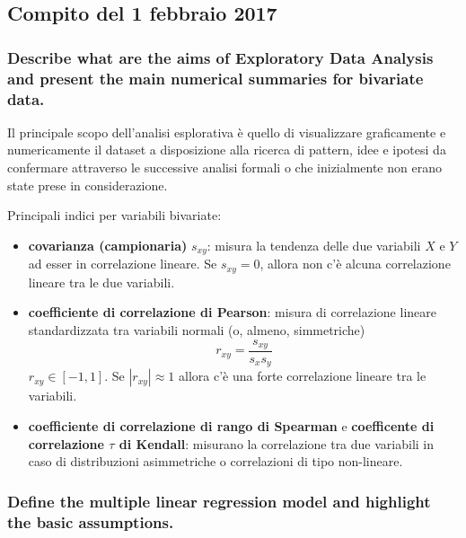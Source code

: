 \documentclass[
]{article}
\author{}
\date{\vspace{-2.5em}}
\begin{document}
\hypertarget{compito-del-1-febbraio-2017}{%
\subsection{Compito del 1 febbraio
2017}\label{compito-del-1-febbraio-2017}}

\hypertarget{describe-what-are-the-aims-of-exploratory-data-analysis-and-present-the-main-numerical-summaries-for-bivariate-data.}{%
\subsubsection{Describe what are the aims of Exploratory Data Analysis
and present the main numerical summaries for bivariate
data.}\label{describe-what-are-the-aims-of-exploratory-data-analysis-and-present-the-main-numerical-summaries-for-bivariate-data.}}

Il principale scopo dell'analisi esplorativa è quello di visualizzare
graficamente e numericamente il dataset a disposizione alla ricerca di
pattern, idee e ipotesi da confermare attraverso le successive analisi
formali o che inizialmente non erano state prese in considerazione.

Principali indici per variabili bivariate:

\begin{itemize}
\item
  \textbf{covarianza (campionaria)} \(s_{xy}\): misura la tendenza delle
  due variabili \(X\) e \(Y\) ad esser in correlazione lineare. Se
  \(s_{xy} = 0\), allora non c'è alcuna correlazione lineare tra le due
  variabili.
\item
  \textbf{coefficiente di correlazione di Pearson}: misura di
  correlazione lineare standardizzata tra variabili normali (o, almeno,
  simmetriche) \[ r_{xy} = \frac{s_{xy}}{s_x s_y} \]
  \(r_{xy} \in [-1, 1]\). Se \(|r_{xy}| \approx 1\) allora c'è una forte
  correlazione lineare tra le variabili.
\item
  \textbf{coefficiente di correlazione di rango di Spearman} e
  \textbf{coefficente di correlazione \(\tau\) di Kendall}: misurano la
  correlazione tra due variabili in caso di distribuzioni asimmetriche o
  correlazioni di tipo non-lineare.
\end{itemize}

\hypertarget{define-the-multiple-linear-regression-model-and-highlight-the-basic-assumptions.}{%
\subsubsection{Define the multiple linear regression model and highlight
the basic
assumptions.}\label{define-the-multiple-linear-regression-model-and-highlight-the-basic-assumptions.}}
\end{document}
